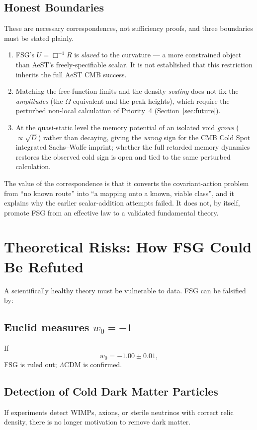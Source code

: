 \documentclass[11pt,a4paper]{article}
\begin{document}
\begin{onehalfspacing}
\subsection{Honest Boundaries}
\label{sec:aest_open}
These are necessary correspondences, not sufficiency proofs, and three boundaries must be stated plainly.
\begin{enumerate}
\item FSG's $U=\Box^{-1}R$ is \emph{slaved} to the curvature --- a more constrained object than AeST's freely-specifiable scalar. It is not established that this restriction inherits the full AeST CMB success.
\item Matching the free-function limits and the density \emph{scaling} does not fix the \emph{amplitudes} (the $\Omega$-equivalent and the peak heights), which require the perturbed non-local calculation of Priority~4 (Section~\ref{sec:future}).
\item At the quasi-static level the memory potential of an isolated void \emph{grows} ($\propto\sqrt{D}$) rather than decaying, giving the \emph{wrong} sign for the CMB Cold Spot integrated Sachs--Wolfe imprint; whether the full retarded memory dynamics restores the observed cold sign is open and tied to the same perturbed calculation.
\end{enumerate}
The value of the correspondence is that it converts the covariant-action problem from ``no known route'' into ``a mapping onto a known, viable class'', and it explains why the earlier scalar-addition attempts failed. It does not, by itself, promote FSG from an effective law to a validated fundamental theory.
\section{Theoretical Risks: How FSG Could Be Refuted}
\label{sec:risks}
A scientifically healthy theory must be vulnerable to data.  
FSG can be falsified by:
\subsection{Euclid measures \texorpdfstring{$w_0=-1$}{w0=-1}}
If
\[
w_0 = -1.00 \pm 0.01,
\]
FSG is ruled out; $\Lambda$CDM is confirmed.
\subsection{Detection of Cold Dark Matter Particles}
If experiments detect WIMPs, axions, or sterile neutrinos with correct relic
density, there is no longer motivation to remove dark matter.

\end{onehalfspacing}
\end{document}

